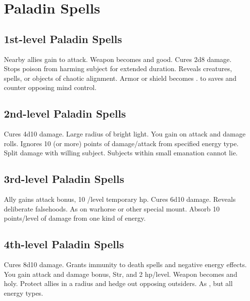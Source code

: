 \section{Paladin Spells}  

\subsection{1st-level Paladin Spells}
\begin{spelllist}
   Nearby allies gain  to attack.
   Weapon becomes  and good.
   Cures 2d8 damage.
   Stops poison from harming subject for extended duration.
   Reveals creatures, spells, or objects of chaotic alignment.
   Armor or shield becomes .
    to saves and counter opposing mind control.
\end{spelllist}

\subsection{2nd-level Paladin Spells}
\begin{spelllist}
   Cures 4d10 damage.
   Large radius of bright light.
   You gain  on attack and damage rolls.
   Ignores 10 (or more) points of damage/attack from specified energy type.
   Split damage with willing subject.
   Subjects within small emanation cannot lie.
\end{spelllist}

\subsection{3rd-level Paladin Spells}
\begin{spelllist} 
   Ally gains  attack bonus, 10 /level temporary hp.
   Cures 6d10 damage.
   Reveals deliberate falsehoods.
   As  on warhorse or other special mount.
   Absorb 10 points/level of damage from one kind of energy.
\end{spelllist}

\subsection{4th-level Paladin Spells}
\begin{spelllist}
   Cures 8d10 damage.
   Grants immunity to death spells and negative energy effects.
   You gain attack and damage bonus,  Str, and 2 hp/level.
   Weapon becomes  and holy.
   Protect allies in a \areamed radius and hedge out opposing outsiders.
   As , but all energy types. 
\end{spelllist}

